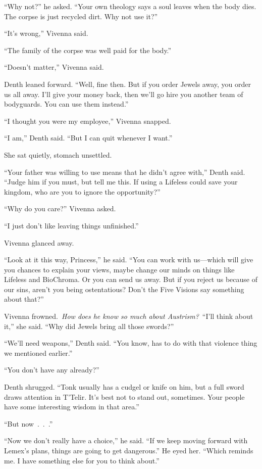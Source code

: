 “Why not?” he asked. “Your own theology says a soul leaves when the body dies. The corpse is just recycled dirt. Why not use it?”

“It’s wrong,” Vivenna said.

“The family of the corpse was well paid for the body.”

“Doesn’t matter,” Vivenna said.

Denth leaned forward. “Well, fine then. But if you order Jewels away, you order us all away. I’ll give your money back, then we’ll go hire you another team of bodyguards. You can use them instead.”

“I thought you were my employee,” Vivenna snapped.

“I am,” Denth said. “But I can quit whenever I want.”

She sat quietly, stomach unsettled.

“Your father was willing to use means that he didn’t agree with,” Denth said. “Judge him if you must, but tell me this. If using a Lifeless could save your kingdom, who are you to ignore the opportunity?”

“Why do you care?” Vivenna asked.

“I just don’t like leaving things unfinished.”

Vivenna glanced away.

“Look at it this way, Princess,” he said. “You can work with us—which will give you chances to explain your views, maybe change our minds on things like Lifeless and BioChroma. Or you can send us away. But if you reject us because of our sins, aren’t you being ostentatious? Don’t the Five Visions say something about that?”

Vivenna frowned.~\textit{How does he know so much about Austrism?}~“I’ll think about it,” she said. “Why did Jewels bring all those swords?”

“We’ll need weapons,” Denth said. “You know, has to do with that violence thing we mentioned earlier.”

“You don’t have any already?”

Denth shrugged. “Tonk usually has a cudgel or knife on him, but a full sword draws attention in T’Telir. It’s best not to stand out, sometimes. Your people have some interesting wisdom in that area.”

“But now~.~.~.”

“Now we don’t really have a choice,” he said. “If we keep moving forward with Lemex’s plans, things are going to get dangerous.” He eyed her. “Which reminds me. I have something else for you to think about.”

